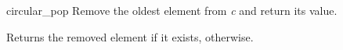 \begin{DoxyDocu}{circular\_pop}
\label{circular_8h_a970392e7f490b18eb18566a389791cc5_a970392e7f490b18eb18566a389791cc5}
Remove the oldest element from {\itshape c} and return its value.

\begin{DoxyReturn}{Returns}
the removed element if it exists,  otherwise.
\end{DoxyReturn}


\end{DoxyDocu}
